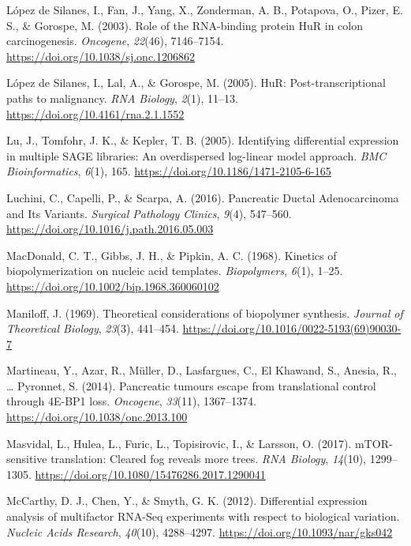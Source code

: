 \documentclass[12pt,openany]{book}
\begin{document}
\hypertarget{ref-LopezdeSilanes2003}{}
López de Silanes, I., Fan, J., Yang, X., Zonderman, A. B., Potapova, O.,
Pizer, E. S., \& Gorospe, M. (2003). Role of the RNA-binding protein HuR
in colon carcinogenesis. \emph{Oncogene}, \emph{22}(46), 7146--7154.
\url{https://doi.org/10.1038/sj.onc.1206862}

\hypertarget{ref-LopezdeSilanes2005}{}
López de Silanes, I., Lal, A., \& Gorospe, M. (2005). HuR:
Post-transcriptional paths to malignancy. \emph{RNA Biology},
\emph{2}(1), 11--13. \url{https://doi.org/10.4161/rna.2.1.1552}

\hypertarget{ref-Lu2005}{}
Lu, J., Tomfohr, J. K., \& Kepler, T. B. (2005). Identifying
differential expression in multiple SAGE libraries: An overdispersed
log-linear model approach. \emph{BMC Bioinformatics}, \emph{6}(1), 165.
\url{https://doi.org/10.1186/1471-2105-6-165}

\hypertarget{ref-Luchini2016}{}
Luchini, C., Capelli, P., \& Scarpa, A. (2016). Pancreatic Ductal
Adenocarcinoma and Its Variants. \emph{Surgical Pathology Clinics},
\emph{9}(4), 547--560. \url{https://doi.org/10.1016/j.path.2016.05.003}

\hypertarget{ref-MacDonald1968a}{}
MacDonald, C. T., Gibbs, J. H., \& Pipkin, A. C. (1968). Kinetics of
biopolymerization on nucleic acid templates. \emph{Biopolymers},
\emph{6}(1), 1--25. \url{https://doi.org/10.1002/bip.1968.360060102}

\hypertarget{ref-Maniloff1969}{}
Maniloff, J. (1969). Theoretical considerations of biopolymer synthesis.
\emph{Journal of Theoretical Biology}, \emph{23}(3), 441--454.
\url{https://doi.org/10.1016/0022-5193(69)90030-7}

\hypertarget{ref-Martineau2014}{}
Martineau, Y., Azar, R., Müller, D., Lasfargues, C., El Khawand, S.,
Anesia, R., \ldots{} Pyronnet, S. (2014). Pancreatic tumours escape from
translational control through 4E-BP1 loss. \emph{Oncogene},
\emph{33}(11), 1367--1374. \url{https://doi.org/10.1038/onc.2013.100}

\hypertarget{ref-Masvidal2017}{}
Masvidal, L., Hulea, L., Furic, L., Topisirovic, I., \& Larsson, O.
(2017). mTOR-sensitive translation: Cleared fog reveals more trees.
\emph{RNA Biology}, \emph{14}(10), 1299--1305.
\url{https://doi.org/10.1080/15476286.2017.1290041}

\hypertarget{ref-McCarthy2012}{}
McCarthy, D. J., Chen, Y., \& Smyth, G. K. (2012). Differential
expression analysis of multifactor RNA-Seq experiments with respect to
biological variation. \emph{Nucleic Acids Research}, \emph{40}(10),
4288--4297. \url{https://doi.org/10.1093/nar/gks042}
\end{document}
